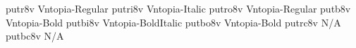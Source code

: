 \documentclass[test]{vnsample}
\begin{document}
\begin{shortsample}
  {putr8v}   {Vntopia-Regular}
 {putri8v}  {Vntopia-Italic}
 {putro8v}  {Vntopia-Regular}
  {putb8v}   {Vntopia-Bold}
 {putbi8v}  {Vntopia-BoldItalic}
 {putbo8v}  {Vntopia-Bold}
 {putrc8v}  {N/A}
 {putbc8v}  {N/A}
\end{shortsample}
\end{document}
